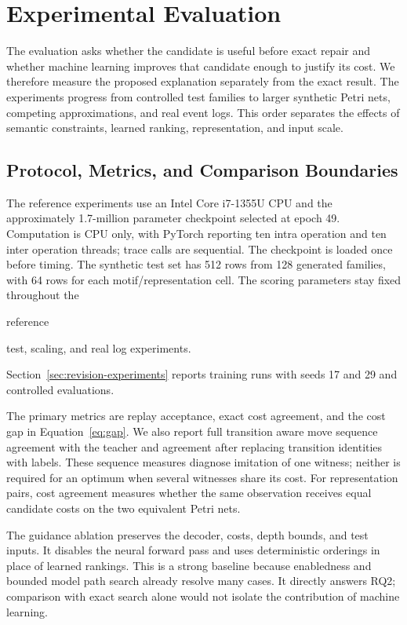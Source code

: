 \section{Experimental Evaluation}
\label{sec:evaluation}

The evaluation asks whether the candidate is useful before exact repair and whether machine learning improves that candidate enough to justify its cost. We therefore measure the proposed explanation separately from the exact result. The experiments progress from controlled test families to larger synthetic Petri nets, competing approximations, and real event logs. This order separates the effects of semantic constraints, learned ranking, representation, and input scale.

\subsection{Protocol, Metrics, and Comparison Boundaries}
\label{sec:protocol}

The reference experiments use an Intel Core i7-1355U CPU and the approximately 1.7-million parameter checkpoint selected at epoch 49. Computation is CPU only, with PyTorch reporting ten intra operation and ten inter operation threads; trace calls are sequential. The checkpoint is loaded once before timing. The synthetic test set has 512 rows from 128 generated families, with 64 rows for each motif/representation cell. The scoring parameters stay fixed throughout the \begin{revised}reference\end{revised} test, scaling, and real log experiments. \begin{revised}Section~\ref{sec:revision-experiments} reports training runs with seeds 17 and 29 and controlled evaluations.\end{revised}

The primary metrics are replay acceptance, exact cost agreement, and the cost gap in Equation~\eqref{eq:gap}. We also report full transition aware move sequence agreement with the teacher and agreement after replacing transition identities with labels. These sequence measures diagnose imitation of one witness; neither is required for an optimum when several witnesses share its cost. For representation pairs, cost agreement measures whether the same observation receives equal candidate costs on the two equivalent Petri nets.

The guidance ablation preserves the decoder, costs, depth bounds, and test inputs. It disables the neural forward pass and uses deterministic orderings in place of learned rankings. This is a strong baseline because enabledness and bounded model path search already resolve many cases. It directly answers RQ2; comparison with exact search alone would not isolate the contribution of machine learning.

